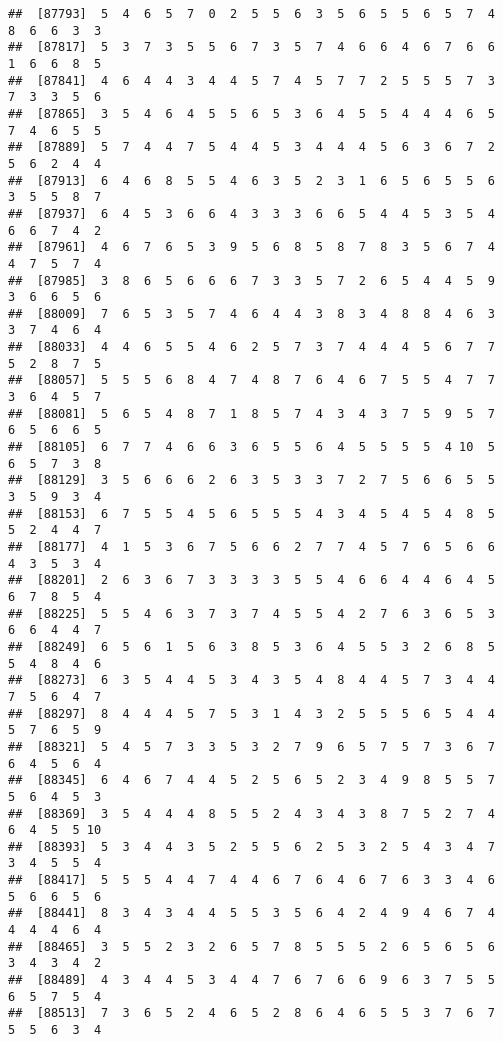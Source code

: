 \documentclass[
]{book}
\begin{document}
\begin{verbatim}
##  [87793]  5  4  6  5  7  0  2  5  5  6  3  5  6  5  5  6  5  7  4  8  6  6  3  3
##  [87817]  5  3  7  3  5  5  6  7  3  5  7  4  6  6  4  6  7  6  6  1  6  6  8  5
##  [87841]  4  6  4  4  3  4  4  5  7  4  5  7  7  2  5  5  5  7  3  7  3  3  5  6
##  [87865]  3  5  4  6  4  5  5  6  5  3  6  4  5  5  4  4  4  6  5  7  4  6  5  5
##  [87889]  5  7  4  4  7  5  4  4  5  3  4  4  4  5  6  3  6  7  2  5  6  2  4  4
##  [87913]  6  4  6  8  5  5  4  6  3  5  2  3  1  6  5  6  5  5  6  3  5  5  8  7
##  [87937]  6  4  5  3  6  6  4  3  3  3  6  6  5  4  4  5  3  5  4  6  6  7  4  2
##  [87961]  4  6  7  6  5  3  9  5  6  8  5  8  7  8  3  5  6  7  4  4  7  5  7  4
##  [87985]  3  8  6  5  6  6  6  7  3  3  5  7  2  6  5  4  4  5  9  3  6  6  5  6
##  [88009]  7  6  5  3  5  7  4  6  4  4  3  8  3  4  8  8  4  6  3  3  7  4  6  4
##  [88033]  4  4  6  5  5  4  6  2  5  7  3  7  4  4  4  5  6  7  7  5  2  8  7  5
##  [88057]  5  5  5  6  8  4  7  4  8  7  6  4  6  7  5  5  4  7  7  3  6  4  5  7
##  [88081]  5  6  5  4  8  7  1  8  5  7  4  3  4  3  7  5  9  5  7  6  5  6  6  5
##  [88105]  6  7  7  4  6  6  3  6  5  5  6  4  5  5  5  5  4 10  5  6  5  7  3  8
##  [88129]  3  5  6  6  6  2  6  3  5  3  3  7  2  7  5  6  6  5  5  3  5  9  3  4
##  [88153]  6  7  5  5  4  5  6  5  5  5  4  3  4  5  4  5  4  8  5  5  2  4  4  7
##  [88177]  4  1  5  3  6  7  5  6  6  2  7  7  4  5  7  6  5  6  6  4  3  5  3  4
##  [88201]  2  6  3  6  7  3  3  3  3  5  5  4  6  6  4  4  6  4  5  6  7  8  5  4
##  [88225]  5  5  4  6  3  7  3  7  4  5  5  4  2  7  6  3  6  5  3  6  6  4  4  7
##  [88249]  6  5  6  1  5  6  3  8  5  3  6  4  5  5  3  2  6  8  5  5  4  8  4  6
##  [88273]  6  3  5  4  4  5  3  4  3  5  4  8  4  4  5  7  3  4  4  7  5  6  4  7
##  [88297]  8  4  4  4  5  7  5  3  1  4  3  2  5  5  5  6  5  4  4  5  7  6  5  9
##  [88321]  5  4  5  7  3  3  5  3  2  7  9  6  5  7  5  7  3  6  7  6  4  5  6  4
##  [88345]  6  4  6  7  4  4  5  2  5  6  5  2  3  4  9  8  5  5  7  5  6  4  5  3
##  [88369]  3  5  4  4  4  8  5  5  2  4  3  4  3  8  7  5  2  7  4  6  4  5  5 10
##  [88393]  5  3  4  4  3  5  2  5  5  6  2  5  3  2  5  4  3  4  7  3  4  5  5  4
##  [88417]  5  5  5  4  4  7  4  4  6  7  6  4  6  7  6  3  3  4  6  5  6  6  5  6
##  [88441]  8  3  4  3  4  4  5  5  3  5  6  4  2  4  9  4  6  7  4  4  4  4  6  4
##  [88465]  3  5  5  2  3  2  6  5  7  8  5  5  5  2  6  5  6  5  6  3  4  3  4  2
##  [88489]  4  3  4  4  5  3  4  4  7  6  7  6  6  9  6  3  7  5  5  6  5  7  5  4
##  [88513]  7  3  6  5  2  4  6  5  2  8  6  4  6  5  5  3  7  6  7  5  5  6  3  4

\end{verbatim}
\end{document}

